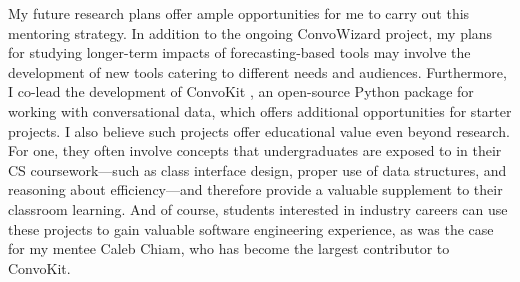 \documentclass[12pt,letterpaper]{article}
\newcommand\ugradclosing\laresearchclosing
\newcommand\ugradclosing\genresearchclosing
\begin{document}
My future research plans offer ample opportunities for me to carry out this mentoring strategy.
In addition to the ongoing ConvoWizard project, my plans for studying longer-term impacts of forecasting-based tools may involve the development of new tools catering to different needs and audiences.
Furthermore, I co-lead the development of ConvoKit \cite{chang_convokit_2020}, an open-source Python package for working with conversational data, which offers additional opportunities for starter projects.
I also believe such projects offer educational value even beyond research.
For one, they often involve concepts that undergraduates are exposed to in their CS coursework---such as class interface design, proper use of data structures, and reasoning about efficiency---and therefore provide a valuable supplement to their classroom learning.
And of course, students interested in industry careers can use these projects to gain valuable software engineering experience, as was the case for my mentee Caleb Chiam, who has become the largest contributor to ConvoKit.
\ugradclosing

\vspace{0.5\baselineskip}
\printbibliography
\end{document}
